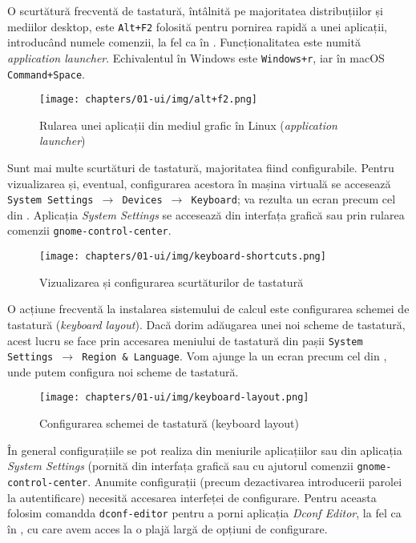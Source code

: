 O scurtătură frecventă de tastatură, întâlnită pe majoritatea distribuțiilor și mediilor desktop, este \texttt{Alt+F2} folosită pentru pornirea rapidă a unei aplicații, introducând numele comenzii, la fel ca în .
Funcționalitatea este numită \textit{application launcher}.
Echivalentul în Windows este \texttt{Windows+r}, iar în macOS \texttt{Command+Space}.

\begin{figure}[!htbp]
  \centering
  \texttt{[image: chapters/01-ui/img/alt+f2.png]}
  \caption{Rularea unei aplicații din mediul grafic în Linux (\textit{application launcher})}
  \label{fig:ui:app-launcher}
\end{figure}

Sunt mai multe scurtături de tastatură, majoritatea fiind configurabile.
Pentru vizualizarea și, eventual, configurarea acestora în mașina virtuală se accesează \texttt{System Settings $\rightarrow$ Devices $\rightarrow$ Keyboard};
va rezulta un ecran precum cel din .
Aplicația \textit{System Settings} se accesează din interfața grafică sau prin rularea comenzii \texttt{gnome-control-center}.

\begin{figure}[!htbp]
  \centering
  \texttt{[image: chapters/01-ui/img/keyboard-shortcuts.png]}
  \caption{Vizualizarea și configurarea scurtăturilor de tastatură}
  \label{fig:ui:keyboard-shortcuts}
\end{figure}

O acțiune frecventă la instalarea sistemului de calcul este configurarea schemei de tastatură (\textit{keyboard layout}).
Dacă dorim adăugarea unei noi scheme de tastatură, acest lucru se face prin accesarea meniului de tastatură din pașii \texttt{System Settings $\rightarrow$ Region \& Language}.
Vom ajunge la un ecran precum cel din , unde putem configura noi scheme de tastatură.

\begin{figure}[!htbp]
  \centering
  \texttt{[image: chapters/01-ui/img/keyboard-layout.png]}
  \caption{Configurarea schemei de tastatură (keyboard layout)}
  \label{fig:ui:keyboard-layout}
\end{figure}

În general configurațiile se pot realiza din meniurile aplicațiilor sau din aplicația \textit{System Settings} (pornită din interfața grafică sau cu ajutorul comenzii \texttt{gnome-control-center}.
Anumite configurații (precum dezactivarea introducerii parolei la autentificare) necesită accesarea interfeței de configurare.
Pentru aceasta folosim comandda \texttt{dconf-editor} pentru a porni aplicația \textit{Dconf Editor}, la fel ca în , cu care avem acces la o plajă largă de opțiuni de configurare.

